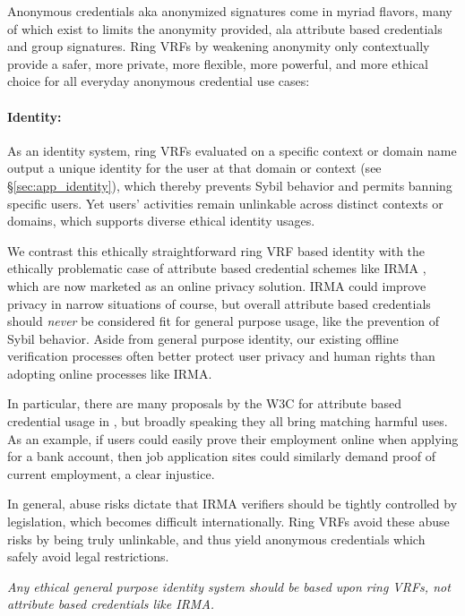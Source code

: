 Anonymous credentials aka anonymized signatures come in myriad flavors,
many of which exist to limits the anonymity provided, ala
 attribute based credentials and group signatures. %
%
Ring VRFs by weakening anonymity only contextually provide a safer,
more private, more flexible, more powerful, and more ethical
choice for all everyday anonymous credential use cases:  %

\paragraph{Identity:}

As an identity system, ring VRFs evaluated on a specific context or
domain name output a unique identity for the user at that domain or
context (see \S\ref{sec:app_identity}), which thereby prevents
Sybil behavior and permits banning specific users.
Yet users' activities remain unlinkable across distinct contexts or
domains, which supports diverse ethical identity usages.

We contrast this ethically straightforward ring VRF based identity
with the ethically problematic case of attribute based credential
schemes like IRMA \cite{IRMA_credentials},
 which are now marketed as an online privacy solution.
IRMA could improve privacy in narrow situations of course, but
overall attribute based credentials should {\it never} be considered
fit for general purpose usage, like the prevention of Sybil behavior.
Aside from general purpose identity, our existing offline verification
processes often better protect user privacy and human rights than
adopting online processes like IRMA.

In particular, there are many proposals by the W3C for attribute based
credential usage in \cite{w3c_vc_use_cases}, but broadly speaking they
all bring matching harmful uses.  %
As an example, if users could easily prove their employment online when
applying for a bank account, then job application sites could similarly
demand proof of current employment, a clear injustice.

In general, abuse risks dictate that IRMA verifiers should be tightly
controlled by legislation, which becomes difficult internationally. 
%
Ring VRFs avoid these abuse risks by being truly unlinkable, and thus
yield anonymous credentials which safely avoid legal restrictions.

{\it Any ethical general purpose identity system should be based
upon ring VRFs, not attribute based credentials like IRMA.}

